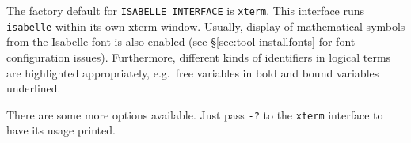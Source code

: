 The factory default for \texttt{ISABELLE_INTERFACE} is \texttt{xterm}.
This interface runs \texttt{isabelle} within its own xterm window.
Usually, display of mathematical symbols from the Isabelle font is
also enabled (see \S\ref{sec:tool-installfonts} for font configuration
issues).  Furthermore, different kinds of identifiers in logical terms
are highlighted appropriately, e.g.\ free variables in bold and bound
variables underlined.

There are some more options available.  Just pass \texttt{-?} to the
\texttt{xterm} interface to have its usage printed.


